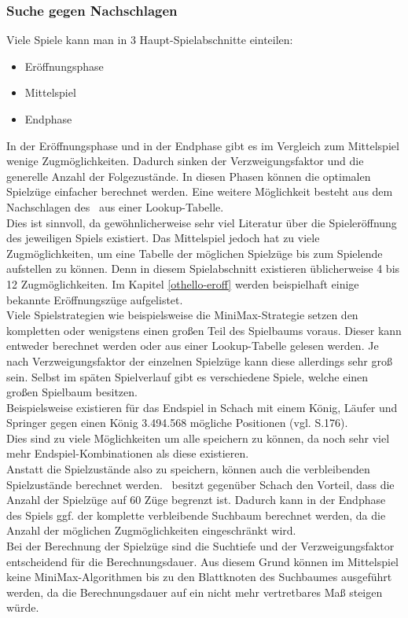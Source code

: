 \subsubsection{Suche gegen Nachschlagen}
\label{lookup}
Viele Spiele kann man in 3 Haupt-Spielabschnitte einteilen:
\begin{itemize}
\item Eröffnungsphase
\item Mittelspiel
\item Endphase
\end{itemize}
In der Eröffnungsphase und in der Endphase gibt es im Vergleich zum Mittelspiel wenige Zugmöglichkeiten. Dadurch sinken der Verzweigungsfaktor und die generelle Anzahl der Folgezustände. In diesen Phasen können die optimalen Spielzüge einfacher berechnet werden. Eine weitere Möglichkeit besteht aus dem Nachschlagen des \states\ aus einer Lookup-Tabelle.
\\Dies ist sinnvoll, da gewöhnlicherweise sehr viel Literatur über die Spieleröffnung des jeweiligen Spiels existiert.
Das Mittelspiel jedoch hat zu viele Zugmöglichkeiten, um eine Tabelle der möglichen Spielzüge bis zum Spielende aufstellen zu können. Denn in diesem Spielabschnitt existieren üblicherweise 4 bis 12 Zugmöglichkeiten. Im Kapitel \ref{othello-eroff} werden beispielhaft einige bekannte Eröffnungszüge aufgelistet.
\\Viele Spielstrategien wie beispielsweise die MiniMax-Strategie setzen den kompletten oder wenigstens einen großen Teil des Spielbaums voraus. Dieser kann entweder berechnet werden oder aus einer Lookup-Tabelle gelesen werden. Je nach Verzweigungsfaktor der einzelnen Spielzüge kann diese allerdings sehr groß sein. Selbst im späten Spielverlauf gibt es verschiedene Spiele, welche einen großen Spielbaum besitzen.
\\Beispielsweise existieren für das Endspiel in Schach mit einem König, Läufer und Springer gegen einen König 3.494.568 mögliche Positionen (vgl. \cite{Russell.2016} S.176).
\\Dies sind zu viele Möglichkeiten um alle speichern zu können, da noch sehr viel mehr Endspiel-Kombinationen als diese existieren.
\\Anstatt die Spielzustände also zu speichern, können auch die verbleibenden Spielzustände berechnet werden. \ot\ besitzt gegenüber Schach den Vorteil, dass die Anzahl der Spielzüge auf 60 Züge begrenzt ist. Dadurch kann in der Endphase des Spiels ggf. der komplette verbleibende Suchbaum berechnet werden, da die Anzahl der möglichen Zugmöglichkeiten eingeschränkt wird.
\\Bei der Berechnung der Spielzüge sind die Suchtiefe und der Verzweigungsfaktor entscheidend für die Berechnungsdauer. Aus diesem Grund können im Mittelspiel keine MiniMax-Algorithmen bis zu den Blattknoten des Suchbaumes ausgeführt werden, da die Berechnungsdauer auf ein nicht mehr vertretbares Maß steigen würde.

